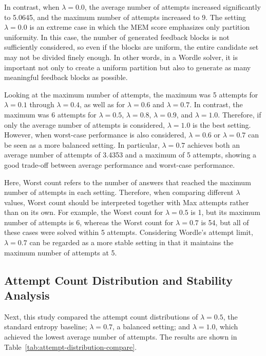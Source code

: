 \documentclass[11pt]{article}
\begin{document}
In contrast, when $\lambda = 0.0$, the average number of attempts increased significantly to 5.0645, and the maximum number of attempts increased to 9.
The setting $\lambda = 0.0$ is an extreme case in which the MEM score emphasizes only partition uniformity.
In this case, the number of generated feedback blocks is not sufficiently considered, so even if the blocks are uniform, the entire candidate set may not be divided finely enough.
In other words, in a Wordle solver, it is important not only to create a uniform partition but also to generate as many meaningful feedback blocks as possible.

Looking at the maximum number of attempts, the maximum was 5 attempts for $\lambda = 0.1$ through $\lambda = 0.4$, as well as for $\lambda = 0.6$ and $\lambda = 0.7$.
In contrast, the maximum was 6 attempts for $\lambda = 0.5$, $\lambda = 0.8$, $\lambda = 0.9$, and $\lambda = 1.0$.
Therefore, if only the average number of attempts is considered, $\lambda = 1.0$ is the best setting.
However, when worst-case performance is also considered, $\lambda = 0.6$ or $\lambda = 0.7$ can be seen as a more balanced setting.
In particular, $\lambda = 0.7$ achieves both an average number of attempts of 3.4353 and a maximum of 5 attempts, showing a good trade-off between average performance and worst-case performance.

Here, Worst count refers to the number of answers that reached the maximum number of attempts in each setting.
Therefore, when comparing different $\lambda$ values, Worst count should be interpreted together with Max attempts rather than on its own.
For example, the Worst count for $\lambda = 0.5$ is 1, but its maximum number of attempts is 6, whereas the Worst count for $\lambda = 0.7$ is 54, but all of these cases were solved within 5 attempts.
Considering Wordle's attempt limit, $\lambda = 0.7$ can be regarded as a more stable setting in that it maintains the maximum number of attempts at 5.

\subsection{Attempt Count Distribution and Stability Analysis}

Next, this study compared the attempt count distributions of $\lambda = 0.5$, the standard entropy baseline; $\lambda = 0.7$, a balanced setting; and $\lambda = 1.0$, which achieved the lowest average number of attempts.
The results are shown in Table~\ref{tab:attempt-distribution-compare}.
\end{document}
